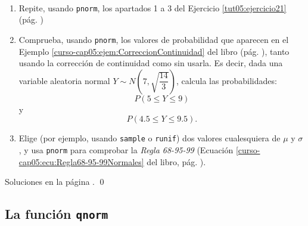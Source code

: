 \documentclass[10pt,a4paper]{article}\usepackage[]{graphicx}\usepackage[]{color}
\newcounter{cont01}
\begin{document}
\begin{ejercicio}
\label{tut05:ejercicio22}
\quad\\
\begin{enumerate}
  \item Repite, usando {\tt pnorm}, los apartados 1 a 3 del Ejercicio \ref{tut05:ejercicio21} (pág. \pageref{tut05:ejercicio21})
  \item Comprueba, usando {\tt pnorm}, los valores de probabilidad que aparecen en el Ejemplo \ref{curso-cap05:ejem:CorreccionContinuidad} del libro (pág. \pageref{curso-cap05:ejem:CorreccionContinuidad}), tanto usando la corrección de continuidad como sin usarla. Es decir, dada una variable aleatoria normal $Y\sim N\left(7, \sqrt{\dfrac{14}{3}}\right)$, calcula las probabilidades:
        \[P(5\leq Y\leq 9)\]
      y
        \[P(4.5\leq Y\leq 9.5).\]
  \item Elige (por ejemplo, usando {\tt sample} o {\tt runif}) dos valores cualesquiera de $\mu$ y $\sigma$, y usa {\tt pnorm} para comprobar la {\em Regla 68-95-99} (Ecuación \ref{curso-cap05:ecu:Regla68-95-99Normales} del libro, pág. \pageref{curso-cap05:ecu:Regla68-95-99Normales}).
\end{enumerate}
Soluciones en la página \pageref{tut05:ejercicio22:sol}.
\qed
\end{ejercicio}

\subsection{La función {\tt qnorm}}
\label{tut05:subsec:qnorm}
\end{document}
